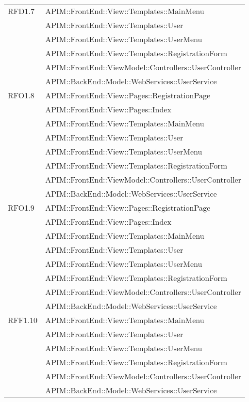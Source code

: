 \begin{longtable}{ p{4cm} | p{12cm} }
		    \hline RFD1.7
			& APIM::FrontEnd::View::Templates::MainMenu \\
			& APIM::FrontEnd::View::Templates::User \\
			& APIM::FrontEnd::View::Templates::UserMenu \\
			& APIM::FrontEnd::View::Templates::RegistrationForm \\
			& APIM::FrontEnd::ViewModel::Controllers::UserController \\
			& APIM::BackEnd::Model::WebServices::UserService \\
			
		    \hline RFO1.8
		    & APIM::FrontEnd::View::Pages::RegistrationPage \\
			& APIM::FrontEnd::View::Pages::Index \\
			& APIM::FrontEnd::View::Templates::MainMenu \\
			& APIM::FrontEnd::View::Templates::User \\
			& APIM::FrontEnd::View::Templates::UserMenu \\
			& APIM::FrontEnd::View::Templates::RegistrationForm \\
			& APIM::FrontEnd::ViewModel::Controllers::UserController \\
			& APIM::BackEnd::Model::WebServices::UserService \\
			
		    \hline RFO1.9
		    & APIM::FrontEnd::View::Pages::RegistrationPage \\
			& APIM::FrontEnd::View::Pages::Index \\
			& APIM::FrontEnd::View::Templates::MainMenu \\
			& APIM::FrontEnd::View::Templates::User \\
			& APIM::FrontEnd::View::Templates::UserMenu \\
			& APIM::FrontEnd::View::Templates::RegistrationForm \\
			& APIM::FrontEnd::ViewModel::Controllers::UserController \\
			& APIM::BackEnd::Model::WebServices::UserService \\
			
		    \hline RFF1.10
			& APIM::FrontEnd::View::Templates::MainMenu \\
			& APIM::FrontEnd::View::Templates::User \\
			& APIM::FrontEnd::View::Templates::UserMenu \\
			& APIM::FrontEnd::View::Templates::RegistrationForm \\
			& APIM::FrontEnd::ViewModel::Controllers::UserController \\
			& APIM::BackEnd::Model::WebServices::UserService \\
		    

\end{longtable}
